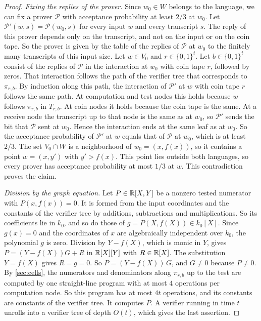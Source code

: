 \begin{proof}
\emph{Fixing the replies of the prover.}
Since $w_0\in W$ belongs to the language, we can fix a prover $\mathcal P$ with acceptance probability at least $2/3$ at $w_0$.
Let $\mathcal P'(w,s)=\mathcal P(w_0,s)$ for every input $w$ and every transcript $s$.
The reply of this prover depends only on the transcript, and not on the input or on the coin tape.
So the prover is given by the table of the replies of $\mathcal P$ at $w_0$ to the finitely many transcripts of this input size.
Let $w\in V_0$ and $r\in\{0,1\}^t$.
Let $b\in\{0,1\}^t$ consist of the replies of $\mathcal P$ in the interaction at $w_0$ with coin tape $r$, followed by zeros.
That interaction follows the path of the verifier tree that corresponds to $\pi_{r,b}$.
By induction along this path, the interaction of $\mathcal P'$ at $w$ with coin tape $r$ follows the same path.
At computation and test nodes this holds because $w$ follows $\pi_{r,b}$ in $T_{r,b}$.
At coin nodes it holds because the coin tape is the same.
At a receive node the transcript up to that node is the same as at $w_0$, so $\mathcal P'$ sends the bit that $\mathcal P$ sent at $w_0$.
Hence the interaction ends at the same leaf as at $w_0$.
So the acceptance probability of $\mathcal P'$ at $w$ equals that of $\mathcal P$ at $w_0$, which is at least $2/3$.
The set $V_0\cap W$ is a neighborhood of $w_0=(x,f(x))$, so it contains a point $w=(x,y')$ with $y'>f(x)$.
This point lies outside both languages, so every prover has acceptance probability at most $1/3$ at $w$.
This contradiction proves the claim.

\emph{Division by the graph equation.}
Let $P\in\mathbb{R}[X,Y]$ be a nonzero tested numerator with $P(x,f(x))=0$.
It is formed from the input coordinates and the constants of the verifier tree by additions, subtractions and multiplications.
So its coefficients lie in $k_0$, and so do those of $g=P(X,f(X))\in k_0[X]$.
Since $g(x)=0$ and the coordinates of $x$ are algebraically independent over $k_0$, the polynomial $g$ is zero.
Division by $Y-f(X)$, which is monic in $Y$, gives $P=(Y-f(X))G+R$ in $\mathbb{R}[X][Y]$ with $R\in\mathbb{R}[X]$.
The substitution $Y=f(X)$ gives $R=g=0$.
So $P=(Y-f(X))\,G$, and $G\ne0$ because $P\ne0$.
By \cref{sec:cells}, the numerators and denominators along $\pi_{r,b}$ up to the test are computed by one straight-line program with at most $4$ operations per computation node.
So this program has at most $4t$ operations, and its constants are constants of the verifier tree.
It computes $P$.
A verifier running in time $t$ unrolls into a verifier tree of depth $O(t)$, which gives the last assertion.
\end{proof}

